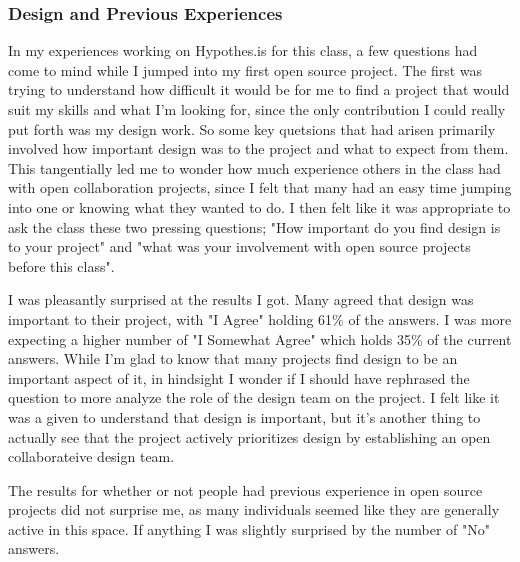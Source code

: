 \subsubsection{Design and Previous Experiences}

In my experiences working on Hypothes.is for this class, a few questions had come to mind while I jumped into my first open source project. The first was trying to understand how difficult it would be for me to find a project that would suit my skills and what I'm looking for, since the only contribution I could really put forth was my design work. So some key quetsions that had arisen primarily involved how important design was to the project and what to expect from them. This tangentially led me to wonder how much experience others in the class had with open collaboration projects, since I felt that many had an easy time jumping into one or knowing what they wanted to do. I then felt like it was appropriate to ask the class these two pressing questions; "How important do you find design is to your project" and "what was your involvement with open source projects before this class". 

I was pleasantly surprised at the results I got. Many agreed that design was important to their project, with "I Agree" holding 61\% of the answers. I was more expecting a higher number of "I Somewhat Agree" which holds 35\% of the current answers. While I'm glad to know that many projects find design to be an important aspect of it, in hindsight I wonder if I should have rephrased the question to more analyze the role of the design team on the project. I felt like it was a given to understand that design is important, but it's another thing to actually see that the project actively prioritizes design by establishing an open collaborateive design team. 

The results for whether or not people had previous experience in open source projects did not surprise me, as many individuals seemed like they are generally active in this space. If anything I was slightly surprised by the number of "No" answers.

